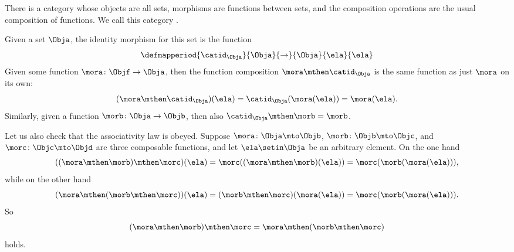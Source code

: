 
\begin{example}
    \label{exa:the-category-of-sets}
    There is a category whose objects are all sets, morphisms are functions between sets, and the composition operations are the usual composition of functions.
    We call this category \Set.

    Given a set $\Obja$, the identity morphism for this set is the function
    \begin{equation}
        \defmapperiod{\catid_\Obja}{\Obja}{\to}{\Obja}{\ela}{\ela}
    \end{equation}
    Given some function $\mora \colon \Objf \to \Obja$, then the function composition $\mora \mthen \catid_\Obja$ is the same function as just $\mora$ on its own:
    \begin{equation}
        (\mora \mthen \catid_\Obja)(\ela)
        = \catid_\Obja(\mora (\ela)) = \mora (\ela).
    \end{equation}
    Similarly, given a function $\morb \colon \Obja \to \Objb$, then also $\catid_\Obja \mthen \morb = \morb$.

    Let us also check that the associativity law is obeyed.
    Suppose $\mora \colon \Obja \mto \Objb$,  $\morb\colon \Objb \mto \Objc$, and  $\morc \colon \Objc \mto \Objd$ are three composable functions, and let $\ela \setin \Obja$ be an arbitrary element.
    On the one hand
    \begin{equation}
        ((\mora \mthen \morb) \mthen \morc)(\ela) =  \morc((\mora \mthen \morb)(\ela)) = \morc (\morb (\mora (\ela))),
    \end{equation}
    while on the other hand
    \begin{equation}
        (\mora \mthen (\morb \mthen \morc))(\ela)
        =  (\morb \mthen \morc)(\mora(\ela)) = \morc (\morb (\mora (\ela))).
    \end{equation}
    So
    \begin{equation}
        (\mora \mthen \morb)
        \mthen \morc = \mora \mthen (\morb \mthen \morc)
    \end{equation}
    holds.
\end{example}

